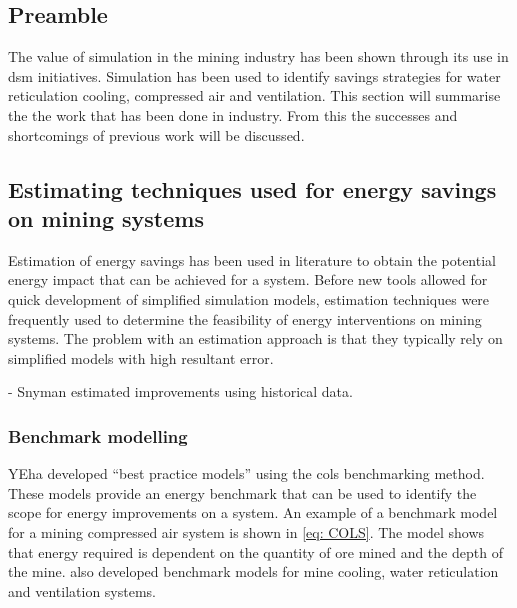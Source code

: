 	\subsection{Preamble}
	The value of simulation in  the mining industry has been shown through its use in \gls{dsm} initiatives. Simulation has been used to identify savings strategies for water reticulation cooling, compressed air and ventilation. This section will summarise the the work that has been done in industry. From this the successes and shortcomings of previous work will be discussed.
	
		\subsection{Estimating techniques used for energy savings on mining systems }
		Estimation of energy savings has been used in literature to obtain the potential energy impact that can be achieved for a system. Before new tools allowed for quick development of simplified simulation models, estimation techniques were frequently used to determine the feasibility of energy interventions on mining systems. The problem with an estimation approach is that they typically rely on simplified models with high resultant error.
		\par 
		- Snyman estimated improvements using historical data.\cite{Snyman2011Masters}\\
		 
		
		\subsubsection{Benchmark modelling}
		YEha  \cite{Cilliers2015PHD} developed \enquote{best practice models} using the \gls{cols} benchmarking method. These models provide an energy benchmark that can be used to identify the scope for energy improvements on a system. An example of a benchmark model for a mining compressed air system is shown in \cref{eq: COLS}. The model shows that energy required is dependent on the quantity of ore mined and the depth of the mine. \cite{Cilliers2015PHD} also developed benchmark models for mine cooling, water reticulation and ventilation systems.

		\begin{figure}[h!]
			\centering
			\fbox{\hspace{2cm}\hspace{2cm}}
			\caption{ }
			\label{fig: 3D Benchmark}
		\end{figure}
